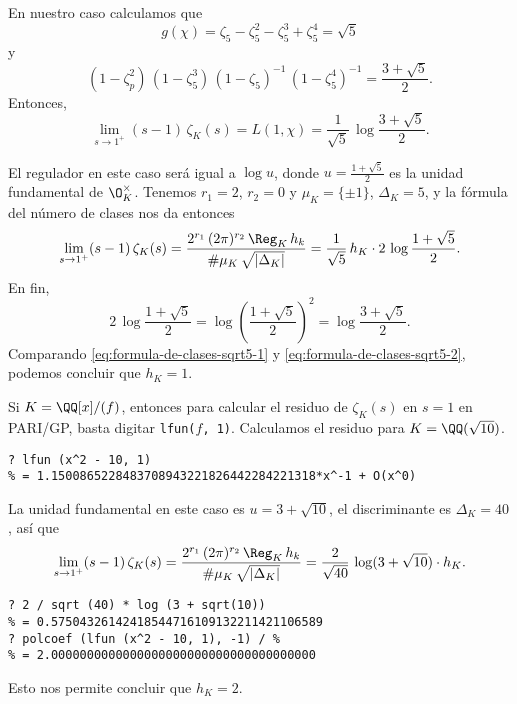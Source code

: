 En nuestro caso calculamos que
$$g (\chi) = \zeta_5 - \zeta_5^2 - \zeta_5^3 + \zeta_5^4 = \sqrt{5}$$
y
$$(1 - \zeta_p^2)\,(1 - \zeta_5^3)\,(1 - \zeta_5)^{-1}\,(1 - \zeta_5^4)^{-1} = \frac{3 + \sqrt{5}}{2}.$$
Entonces,
\begin{equation}
  \label{eq:formula-de-clases-sqrt5-1}
  \lim_{s \to 1^+} (s - 1)\,\zeta_K (s) =
  L (1, \chi) = \frac{1}{\sqrt{5}}\,\log\frac{3 + \sqrt{5}}{2}.
\end{equation}

El regulador en este caso será igual a $\log u$, donde
$u = \frac{1+\sqrt{5}}{2}$ es la unidad fundamental de $\O_K^\times$.
Tenemos $r_1 = 2$, $r_2 = 0$ y $\mu_K = \{ \pm 1 \}$, $\Delta_K = 5$, y la
fórmula del número de clases nos da entonces
\begin{equation}
  \label{eq:formula-de-clases-sqrt5-2}
  \lim_{s \to 1^+} (s - 1)\,\zeta_K (s) =
  \frac{2^{r_1}\,(2\pi)^{r_2}\,\Reg_K\,h_k}{\#\mu_K\,\sqrt{|\Delta_K|}} =
  \frac{1}{\sqrt{5}}\,h_K\cdot 2\,\log \frac{1+\sqrt{5}}{2}.
\end{equation}
En fin,
\[ 2\,\log \frac{1+\sqrt{5}}{2} =
   \log \left(\frac{1+\sqrt{5}}{2}\right)^2 =
   \log \frac{3+\sqrt{5}}{2}. \]
Comparando \eqref{eq:formula-de-clases-sqrt5-1} y
\eqref{eq:formula-de-clases-sqrt5-2}, podemos concluir que $h_K = 1$.

\vspace{1em}

Si $K = \QQ[x]/(f)$, entonces para calcular el residuo de $\zeta_K (s)$ en
$s = 1$ en PARI/GP, basta digitar \texttt{lfun($f$, 1)}. Calculamos el residuo
para $K = \QQ (\sqrt{10})$.
\begin{shaded}
\begin{verbatim}
? lfun (x^2 - 10, 1)
% = 1.1500865228483708943221826442284221318*x^-1 + O(x^0)
\end{verbatim}
\end{shaded}

La unidad fundamental en este caso es $u = 3 + \sqrt{10}$, el discriminante
es $\Delta_K = 40$, así que
\[ \lim_{s \to 1^+} (s - 1)\,\zeta_K (s) =
   \frac{2^{r_1}\,(2\pi)^{r_2}\,\Reg_K\,h_k}{\#\mu_K\,\sqrt{|\Delta_K|}} =
   \frac{2}{\sqrt{40}}\,\log (3 + \sqrt{10})\cdot h_K. \]
\begin{shaded}
\begin{verbatim}
? 2 / sqrt (40) * log (3 + sqrt(10))
% = 0.57504326142418544716109132211421106589
? polcoef (lfun (x^2 - 10, 1), -1) / %
% = 2.0000000000000000000000000000000000000
\end{verbatim}
\end{shaded}
Esto nos permite concluir que $h_K = 2$.

